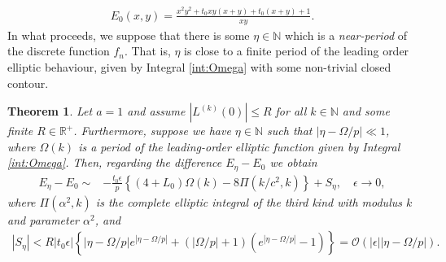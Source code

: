 \documentclass[reqno,a4paper]{amsart}
\numberwithin{equation}{section}
\theoremstyle{plain}
\newtheorem{theorem}{Theorem}[section]
\theoremstyle{remark}
\begin{document}
\begin{align*}
    E_0(x,y)=\frac{x^2y^2+t_0xy(x+y)+t_0(x+y)+1}{xy}.
\end{align*}
In what proceeds, we suppose that there is some $\eta\in\mathbb{N}$ which is a \emph{near-period} of the discrete function $f_n$. That is, $\eta$ is close to a finite period of the leading order elliptic behaviour, given by Integral \eqref{int:Omega} with some non-trivial closed contour.
\begin{theorem}\label{thrm:main2}
    Let $a=1$ and assume $|L^{(k)}(0)|\leq R$ for all $k\in\mathbb{N}$ and some finite $R\in\mathbb{R}^+$. Furthermore, suppose we have $\eta\in\mathbb{N}$ such that $|\eta-\Omega/p|\ll1$, where $\Omega(k)$ is a period of the leading-order elliptic function given by Integral \eqref{int:Omega}. Then, regarding the difference $E_\eta-E_0$ we obtain
    \begin{align*}
        E_\eta-E_{0}\sim&-\frac{t_0\epsilon}{p}\left\{(4+L_0)\Omega(k)-8\Pi(k/c^2,k)\right\}+S_\eta,\quad\epsilon\to0,
    \end{align*}
    where $\Pi(\alpha^2,k)$ is the complete elliptic integral of the third kind with modulus $k$ and parameter $\alpha^2$, and
    \begin{align*}
        |S_\eta|<R|t_0\epsilon|\left\{|\eta-\Omega/p|e^{|\eta-\Omega/p|}+\left(\left|\Omega/p\right|+1\right)\left(e^{|\eta-\Omega/p|}-1\right)\right\}=\mathcal{O}\left(|\epsilon||\eta-\Omega/p|\right).
    \end{align*}
\end{theorem}
\end{document}
